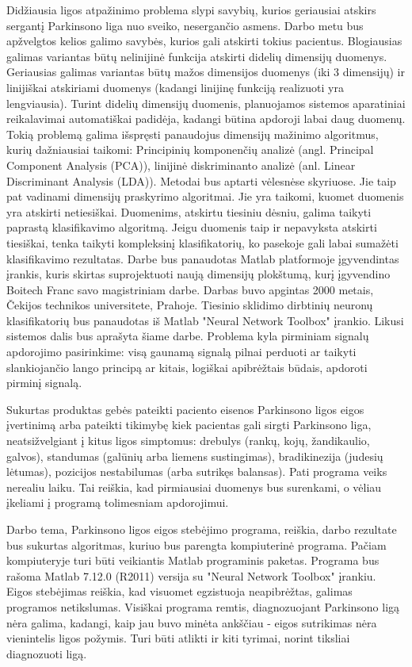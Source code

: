 \documentclass[10pt,onecolumn,draftcls]{IEEEtran}
\begin{document}
Didžiausia ligos atpažinimo problema slypi savybių, kurios geriausiai
atskirs sergantį Parkinsono liga nuo sveiko, nesergančio asmens. Darbo
metu bus apžvelgtos kelios galimo savybės, kurios gali atskirti tokius
pacientus. Blogiausias galimas variantas būtų nelinijinė funkcija
atskirti didelių dimensijų duomenys. Geriausias galimas variantas būtų
mažos dimensijos duomenys (iki 3 dimensijų) ir linijiškai atskiriami
duomenys (kadangi linijinę funkciją realizuoti yra
lengviausia). Turint didelių dimensijų duomenis, planuojamos sistemos
aparatiniai reikalavimai automatiškai padidėja, kadangi būtina
apdoroji labai daug duomenų. Tokią problemą galima išspręsti
panaudojus dimensijų mažinimo algoritmus, kurių dažniausiai taikomi:
Principinių komponenčių analizė (angl. Principal Component Analysis
(PCA)), linijinė diskriminanto analizė (anl. Linear Discriminant
Analysis (LDA)). Metodai bus aptarti vėlesnėse skyriuose. Jie taip pat
vadinami dimensijų praskyrimo algoritmai. Jie yra taikomi, kuomet
duomenis yra atskirti netiesiškai. Duomenims, atskirtu tiesiniu
dėsniu, galima taikyti paprastą klasifikavimo algoritmą. Jeigu
duomenis taip ir nepavyksta atskirti tiesiškai, tenka taikyti
kompleksinį klasifikatorių, ko pasekoje gali labai sumažėti
klasifikavimo rezultatas. Darbe bus panaudotas Matlab platformoje
įgyvendintas įrankis, kuris skirtas suprojektuoti naują dimensijų
plokštumą, kurį įgyvendino Boitech Franc savo magistriniam
darbe. Darbas buvo apgintas 2000 metais, Čekijos technikos
universitete, Prahoje. Tiesinio sklidimo dirbtinių neuronų
klasifikatorių bus panaudotas iš Matlab "Neural Network Toolbox"
įrankio. Likusi sistemos dalis bus aprašyta šiame darbe. Problema kyla
pirminiam signalų apdorojimo pasirinkime: visą gaunamą signalą pilnai
perduoti ar taikyti slankiojančio lango principą ar kitais, logiškai
apibrėžtais būdais, apdoroti pirminį signalą.

Sukurtas produktas gebės pateikti paciento eisenos Parkinsono ligos
eigos įvertinimą arba pateikti tikimybę kiek pacientas gali sirgti
Parkinsono liga, neatsižvelgiant į kitus ligos simptomus: drebulys
(rankų, kojų, žandikaulio, galvos), standumas (galūnių arba liemens
sustingimas), bradikinezija (judesių lėtumas), pozicijos nestabilumas
(arba sutrikęs balansas). Pati programa veiks nerealiu laiku. Tai
reiškia, kad pirmiausiai duomenys bus surenkami, o vėliau įkeliami į
programą tolimesniam apdorojimui.

Darbo tema, Parkinsono ligos eigos stebėjimo programa, reiškia, darbo
rezultate bus sukurtas algoritmas, kuriuo bus parengta kompiuterinė
programa. Pačiam kompiuteryje turi būti veikiantis Matlab programinis
paketas. Programa bus rašoma Matlab 7.12.0 (R2011) versija su "Neural
Network Toolbox" įrankiu. Eigos stebėjimas reiškia, kad visuomet
egzistuoja neapibrėžtas, galimas programos netikslumas. Visiškai
programa remtis, diagnozuojant Parkinsono ligą nėra galima, kadangi,
kaip jau buvo minėta ankščiau - eigos sutrikimas nėra vienintelis
ligos požymis. Turi būti atlikti ir kiti tyrimai, norint tiksliai
diagnozuoti ligą.
\end{document}
